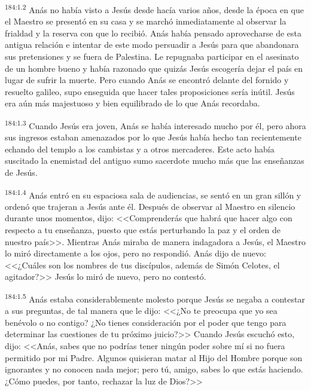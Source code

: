 \par 
\textsuperscript{184:1.2} Anás no había visto a Jesús desde hacía varios años, desde la época en que el Maestro se presentó en su casa y se marchó inmediatamente al observar la frialdad y la reserva con que lo recibió. Anás había pensado aprovecharse de esta antigua relación e intentar de este modo persuadir a Jesús para que abandonara sus pretensiones y se fuera de Palestina. Le repugnaba participar en el asesinato de un hombre bueno y había razonado que quizás Jesús escogería dejar el país en lugar de sufrir la muerte. Pero cuando Anás se encontró delante del fornido y resuelto galileo, supo enseguida que hacer tales proposiciones sería inútil. Jesús era aún más majestuoso y bien equilibrado de lo que Anás recordaba.

\par 
\textsuperscript{184:1.3} Cuando Jesús era joven, Anás se había interesado mucho por él, pero ahora sus ingresos estaban amenazados por lo que Jesús había hecho tan recientemente echando del templo a los cambistas y a otros mercaderes. Este acto había suscitado la enemistad del antiguo sumo sacerdote mucho más que las enseñanzas de Jesús.

\par 
\textsuperscript{184:1.4} Anás entró en su espaciosa sala de audiencias, se sentó en un gran sillón y ordenó que trajeran a Jesús ante él. Después de observar al Maestro en silencio durante unos momentos, dijo: <<Comprenderás que habrá que hacer algo con respecto a tu enseñanza, puesto que estás perturbando la paz y el orden de nuestro país>>. Mientras Anás miraba de manera indagadora a Jesús, el Maestro lo miró directamente a los ojos, pero no respondió. Anás dijo de nuevo: <<¿Cuáles son los nombres de tus discípulos, además de Simón Celotes, el agitador?>> Jesús lo miró de nuevo, pero no contestó.

\par 
\textsuperscript{184:1.5} Anás estaba considerablemente molesto porque Jesús se negaba a contestar a sus preguntas, de tal manera que le dijo: <<¿No te preocupa que yo sea benévolo o no contigo? ¿No tienes consideración por el poder que tengo para determinar las cuestiones de tu próximo juicio?>> Cuando Jesús escuchó esto, dijo: <<Anás, sabes que no podrías tener ningún poder sobre mí si no fuera permitido por mi Padre. Algunos quisieran matar al Hijo del Hombre porque son ignorantes y no conocen nada mejor; pero tú, amigo, sabes lo que estás haciendo. ¿Cómo puedes, por tanto, rechazar la luz de Dios?>>

